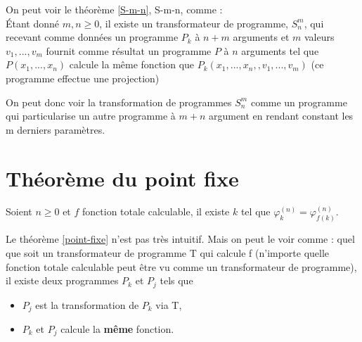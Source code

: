 \begin{myrem}
	On peut voir le théorème \ref{S-m-n}, S-m-n, comme : \\
	Étant donné $m,n \geq 0$, il existe un transformateur de programme, $S^m_n$, qui recevant comme
	données un programme $P_k$ à $n+m$ arguments et $m$ valeurs $v_1,...,v_m$
	fournit comme résultat un programme $P$ à $n$ arguments tel que
	$P(x_1,...,x_n)$ calcule la même fonction que
	$P_k(x_1,...,x_n,,v_1,...,v_m)$ (ce programme effectue une projection)
\end{myrem}

\begin{myrem}
	On peut donc voir la transformation de programmes $S^m_n$ comme un
	programme qui particularise un autre programme à $m+n$ argument en rendant
	constant les m derniers paramètres.
\end{myrem}

\section{Théorème du point fixe}
\label{sec:th_or_me_du_point_fixe}
\begin{mytheo}
	\label{point-fixe}
    Soient $n \geq 0$ et $f$ fonction totale
	calculable, il existe $k$ tel que $\varphi^{(n)}_k = \varphi^{(n)}_{f(k)}$.
\end{mytheo}

\begin{myrem}
	Le théorème \ref{point-fixe} n'est pas très intuitif. Mais on peut le
	voir comme : quel que soit un transformateur de programme T qui calcule f (n'importe quelle fonction totale calculable peut être vu comme un transformateur	de programme),
	il existe deux programmes $P_k$ et $P_j$ tels que
	\begin{itemize}
		\item $P_j$ est la transformation de $P_k$ via T,
		\item $P_k$ et $P_j$ calcule la \textbf{même} fonction.
	\end{itemize}
\end{myrem}

